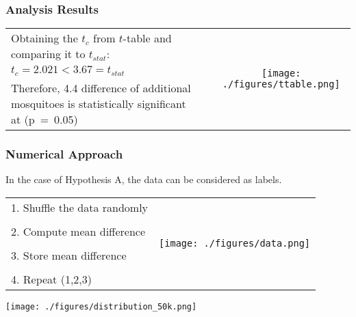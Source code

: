 \begin{frame}
\frametitle{Analysis Results}
\begin{center}
\vspace{-1.5cm}\begin{tabular}{p{4.5cm}p{.5cm}c}
  \small Obtaining the $t_c$ from $t$-table and comparing it to $t_{stat}$:
  &&\multirow{4}{*}{\texttt{[image: ./figures/ttable.png]}} \\
  $t_c = 2.021 < 3.67 = t_{stat}$ && \\
  \vspace{1cm} Therefore, 4.4 difference of additional mosquitoes is statistically significant at (p~=~0.05) &&
\end{tabular}\end{center}
\end{frame}

\begin{frame}
\frametitle{Numerical Approach}
\vspace{-1.5cm}
In the case of  Hypothesis A, the data can be considered as labels.
\begin{center}
  \begin{tabular}{p{5cm}c}
    1. Shuffle the data randomly  & \multirow{7}{*}{\texttt{[image: ./figures/data.png]}} \\
    &\\
    2. Compute mean difference& \\
    &\\
    3. Store mean difference & \\
    &\\
    4. Repeat (1,2,3)
  \end{tabular}
\end{center}
\end{frame}

\begin{frame}
\end{frame}

\begin{frame}
\centerline{\texttt{[image: ./figures/distribution\_50k.png]}}
\end{frame}


